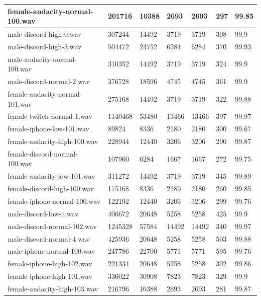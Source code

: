 \documentclass[a4paper,12pt]{extarticle}
\begin{document}
\begin{table}[!ht]
{\begin{tabular}{|l|l|l|l|l|l|l|}
        female-audacity-normal-100.wav & 201716 & 10388 & 2693 & 2693 & 297 & 99.85 \\ \hline
        male-discord-high-0.wav & 307244 & 14492 & 3719 & 3719 & 308 & 99.9 \\ \hline
        male-discord-high-3.wav & 504472 & 24752 & 6284 & 6284 & 370 & 99.93 \\ \hline
        male-audacity-normal-100.wav & 310352 & 14492 & 3719 & 3719 & 324 & 99.9 \\ \hline
        male-discord-normal-2.wav & 376728 & 18596 & 4745 & 4745 & 361 & 99.9 \\ \hline
        female-audacity-normal-101.wav & 275168 & 14492 & 3719 & 3719 & 322 & 99.88 \\ \hline
        female-twitch-normal-1.wav & 1140468 & 53480 & 13466 & 13466 & 397 & 99.97 \\ \hline
        female-iphone-low-101.wav & 89824 & 8336 & 2180 & 2180 & 300 & 99.67 \\ \hline
        female-audacity-high-100.wav & 228944 & 12440 & 3206 & 3206 & 290 & 99.87 \\ \hline
        female-discord-normal-100.wav & 107960 & 6284 & 1667 & 1667 & 272 & 99.75 \\ \hline
        female-audacity-low-101.wav & 311272 & 14492 & 3719 & 3719 & 345 & 99.89 \\ \hline
        female-discord-high-100.wav & 175168 & 8336 & 2180 & 2180 & 260 & 99.85 \\ \hline
        female-iphone-normal-100.wav & 122192 & 12440 & 3206 & 3206 & 299 & 99.76 \\ \hline
        male-discord-low-1.wav & 406672 & 20648 & 5258 & 5258 & 425 & 99.9 \\ \hline
        male-discord-normal-102.wav & 1245328 & 57584 & 14492 & 14492 & 340 & 99.97 \\ \hline
        male-discord-normal-4.wav & 425936 & 20648 & 5258 & 5258 & 503 & 99.88 \\ \hline
        male-iphone-normal-100.wav & 247786 & 22700 & 5771 & 5771 & 595 & 99.76 \\ \hline
        female-iphone-high-102.wav & 221334 & 20648 & 5258 & 5258 & 302 & 99.86 \\ \hline
        female-iphone-high-101.wav & 336022 & 30908 & 7823 & 7823 & 329 & 99.9 \\ \hline
        female-audacity-high-103.wav & 216796 & 10388 & 2693 & 2693 & 281 & 99.87 \\ \hline

\end{tabular}}
\end{table}
\end{document}
